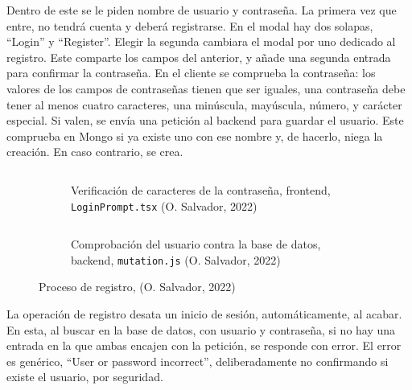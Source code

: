 \documentclass[11pt]{article}
\begin{document}
\begin{flushleft}
	Dentro de este se le piden nombre de usuario y contraseña. La primera vez que entre, no tendrá cuenta y deberá registrarse. En el modal hay dos solapas, ``Login'' y ``Register''. Elegir la segunda cambiara el modal por uno dedicado al registro. Este comparte los campos del anterior, y añade una segunda entrada para confirmar la contraseña. En el cliente se comprueba la contraseña: los valores de los campos de contraseñas tienen que ser iguales, una contraseña debe tener al menos cuatro caracteres, una minúscula, mayúscula, número, y carácter especial. Si valen, se envía una petición al backend para guardar el usuario. Este comprueba en Mongo si ya existe uno con ese nombre y, de hacerlo, niega la creación. En caso contrario, se crea.
	\linebreak
	
		\begin{figure}[htb]
			\centering
			\begin{subfigure}{.9\textwidth}
				\hspace{-3cm}
				\inputminted[fontsize=\scriptsize, firstline=74, lastline=74, linenos, frame=single, tabsize=1]{javascript}{../../frontend/src/components/LoginPrompt.tsx}
				\caption{Verificación de caracteres de la contraseña, frontend, \texttt{LoginPrompt.tsx} (O. Salvador, 2022)}
			\end{subfigure}
			\linebreak
			
			
			
			\begin{subfigure}{.9\textwidth}
				\hspace{-3cm}
				\inputminted[fontsize=\scriptsize, firstline=153, lastline=160, linenos, frame=single]{javascript}{../../backend/src/resolvers/mutation.js}
				\caption{Comprobación del usuario contra la base de datos, backend, \texttt{mutation.js} (O. Salvador, 2022)}
			\end{subfigure}
			

			\caption{Proceso de registro, (O. Salvador, 2022)}
		\end{figure}
		
	La operación de registro desata un inicio de sesión, automáticamente, al acabar. En esta, al buscar en la base de datos, con usuario y contraseña, si no hay una entrada en la que ambas encajen con la petición, se responde con error. El error es genérico, ``User or password incorrect'', deliberadamente no confirmando si existe el usuario, por seguridad. 
	\linebreak
	

\end{flushleft}
\end{document}
